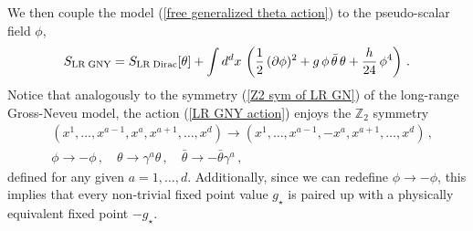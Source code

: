 \documentclass[aps,amsmath,amssymb,prd,showpacs,floatfix,preprint,superscriptaddress,nofootinbib,12pt]{article}
\begin{document}
We then couple the model (\ref{free generalized theta action})
to the pseudo-scalar field $\phi$,
\begin{equation}
\label{LR GNY action}
S_{\textrm{LR\;GNY}}=S_{\textrm{LR\;Dirac}}[\theta] 
+\int d^dx\,\left(\frac{1}{2}\,(\partial\phi)^2 + g \,\phi\, \bar\theta\,\theta+\frac{h}{24}\,\phi^4\right)\,.
\end{equation}
Notice that analogously to the symmetry (\ref{Z2 sym of LR GN}) of the long-range Gross-Neveu model,
the action (\ref{LR GNY action}) enjoys the $\mathbb{Z}_2$ symmetry
\begin{equation}
\label{Z2 sym of LR GNY}
\begin{aligned}
&(x^1,\dots,x^{a-1},x^a,x^{a+1},\dots,x^d)\rightarrow (x^1,\dots,x^{a-1},-x^a,x^{a+1},\dots,x^d)\,,\\
&\phi\rightarrow-\phi\,,\quad\theta\rightarrow \gamma^a\theta\,,\quad
\bar\theta\rightarrow-\bar\theta\gamma^a\,,
\end{aligned}
\end{equation}
defined for any given $a=1,\dots,d$. Additionally, since we can redefine $\phi\rightarrow-\phi$, this implies that every non-trivial
fixed point value $g_\star$ is paired up with a physically equivalent fixed point $-g_\star$.
\end{document}
